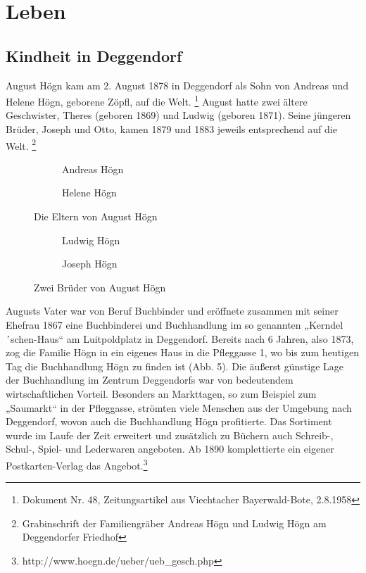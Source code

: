 \section{Leben}

\hypertarget{RefHeadingToc100333725}{}\subsection{Kindheit in
Deggendorf}
\hypertarget{RefHeadingToc100333726}{}

August Högn kam am 2. August 1878
in Deggendorf als Sohn von Andreas und Helene Högn, geborene Zöpfl, auf
die Welt. \footnote{Dokument Nr. 48, Zeitungsartikel aus Viechtacher
Bayerwald-Bote, 2.8.1958} August hatte zwei ältere Geschwister, Theres
(geboren 1869) und Ludwig (geboren 1871). Seine jüngeren Brüder, Joseph
und Otto, kamen 1879 und 1883 jeweils entsprechend auf die
Welt. \footnote{Grabinschrift der Familiengräber Andreas Högn und
Ludwig Högn am Deggendorfer Friedhof}

\begin{figure}
%
\begin{subfigure}[b]{0.5\linewidth}
\centering
{}
\caption{Andreas Högn}
\end{subfigure}
%
\begin{subfigure}[b]{0.5\linewidth}
\centering
{}
\caption{Helene Högn}
\end{subfigure}
%
\caption{Die Eltern von August Högn}
\end{figure}

\begin{figure}
%
\begin{subfigure}[b]{0.5\linewidth}
\centering
{}
\caption{Ludwig Högn}
\end{subfigure}
%
\begin{subfigure}[b]{0.5\linewidth}
\centering
{}
\caption{Joseph Högn}
\end{subfigure}
%
\caption{Zwei Brüder von August Högn}
\end{figure}

Augusts Vater war von Beruf Buchbinder und eröffnete zusammen mit seiner
Ehefrau 1867 eine Buchbinderei und Buchhandlung im so genannten
„Kerndel´schen-Haus“ am Luitpoldplatz in Deggendorf. Bereits nach 6
Jahren, also 1873, zog die Familie Högn in ein eigenes Haus in die
Pfleggasse 1, wo bis zum heutigen Tag die Buchhandlung Högn zu finden
ist (Abb. 5). Die äußerst günstige Lage der Buchhandlung im Zentrum
Deggendorfs war von bedeutendem wirtschaftlichen Vorteil. Besonders an
Markttagen, so zum Beispiel zum „Saumarkt“ in der Pfleggasse, strömten
viele Menschen aus der Umgebung nach Deggendorf, wovon auch die
Buchhandlung Högn profitierte. Das Sortiment wurde im Laufe der Zeit
erweitert und zusätzlich zu Büchern auch Schreib-, Schul-, Spiel- und
Lederwaren angeboten. Ab 1890 komplettierte ein eigener
Postkarten-Verlag das Angebot.\footnote{
http://www.hoegn.de/ueber/ueb\_gesch.php}

